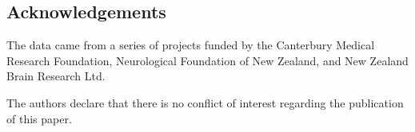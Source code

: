 \documentclass[jou,a4paper]{apa6}
\begin{document}
\subsection{Acknowledgements}
The data came from a series of projects funded by the Canterbury Medical Research Foundation, Neurological Foundation of New Zealand, and New Zealand Brain Research Ltd.

The authors declare that there is no conflict of interest regarding the
publication of this paper.


\end{document}
